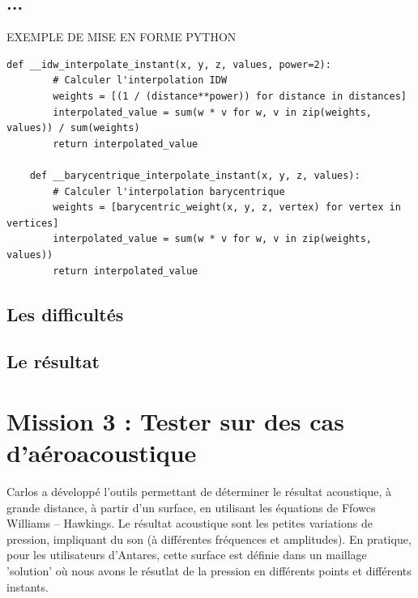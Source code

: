 \subsection{...}

EXEMPLE DE MISE EN FORME PYTHON
\begin{lstlisting}[caption=Calcul de l'interpolation, label={lst:interpolation}]
    def __idw_interpolate_instant(x, y, z, values, power=2):
        # Calculer l'interpolation IDW
        weights = [(1 / (distance**power)) for distance in distances]
        interpolated_value = sum(w * v for w, v in zip(weights, values)) / sum(weights)
        return interpolated_value
    
    def __barycentrique_interpolate_instant(x, y, z, values):
        # Calculer l'interpolation barycentrique
        weights = [barycentric_weight(x, y, z, vertex) for vertex in vertices]
        interpolated_value = sum(w * v for w, v in zip(weights, values))
        return interpolated_value
\end{lstlisting}


\subsection{Les difficultés}
\subsection{Le résultat}



\section{Mission 3 : Tester sur des cas d'aéroacoustique}
Carlos a développé l'outils permettant de déterminer le résultat acoustique, à grande distance, à partir d'un surface, en utilisant les équations de Ffowcs Williams – Hawkings. Le résultat acoustique sont les petites variations de pression, impliquant du son (à différentes fréquences et amplitudes). En pratique, pour les utilisateurs d'Antares, cette surface est définie dans un maillage 'solution' où nous avons le résutlat de la pression en différents points et différents instants.
